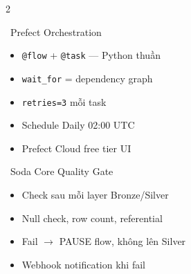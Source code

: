 \documentclass[12pt, a4paper]{article}
\newcommand{\code}[1]{\texttt{\small#1}}
\begin{document}
\begin{multicols}{2}

\begin{keybox}{\faTasks\ Prefect Orchestration}
\begin{itemize}[leftmargin=1em, itemsep=2pt, topsep=2pt]
  \item \code{@flow} + \code{@task} --- Python thuần
  \item \code{wait\_for} = dependency graph
  \item \code{retries=3} mỗi task
  \item Schedule Daily 02:00 UTC
  \item Prefect Cloud free tier UI
\end{itemize}
\end{keybox}

\columnbreak

\begin{keybox}{\faShieldAlt\ Soda Core Quality Gate}
\begin{itemize}[leftmargin=1em, itemsep=2pt, topsep=2pt]
  \item Check sau mỗi layer Bronze/Silver
  \item Null check, row count, referential
  \item Fail $\to$ PAUSE flow, không lên Silver
  \item Webhook notification khi fail
\end{itemize}
\end{keybox}

\end{multicols}

\vspace{0.8em}
\end{document}
